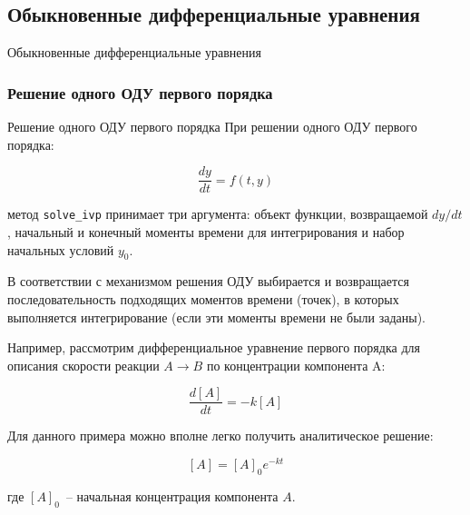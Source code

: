 \documentclass[aspectratio=169, mathserif]{beamer}	%
\begin{document}
\subsection{Обыкновенные дифференциальные уравнения}
\begin{frame}[fragile]{Обыкновенные дифференциальные уравнения}
\scriptsize
\subsubsection{Решение одного ОДУ первого порядка}
\begin{alertblock}{\footnotesize{Решение одного ОДУ первого порядка}}
	При решении одного ОДУ первого порядка:
	
	$$\dfrac{dy}{dt} = f(t, y)$$
	
	\noindent метод \texttt{solve\_ivp} принимает три аргумента: объект функции, возвращаемой $dy/dt$, начальный и конечный моменты времени для интегрирования и набор начальных условий $y_0$.
	
	В соответствии с механизмом решения ОДУ выбирается и возвращается последовательность подходящих моментов времени (точек), в которых выполняется интегрирование (если эти моменты времени не были заданы).
\end{alertblock}
Например, рассмотрим дифференциальное уравнение первого порядка для описания скорости реакции $A \rightarrow B$ по концентрации компонента A: 

$$\dfrac{d\left[A\right]}{dt} = -k\left[A\right]$$

Для данного примера можно вполне легко получить аналитическое решение:

$$\left[A\right] = \left[A\right]_0e^{-kt}$$

\noindent где $\left[A\right]_0$~-- начальная концентрация компонента $A$.

\vfill
\end{frame}
\end{document}
